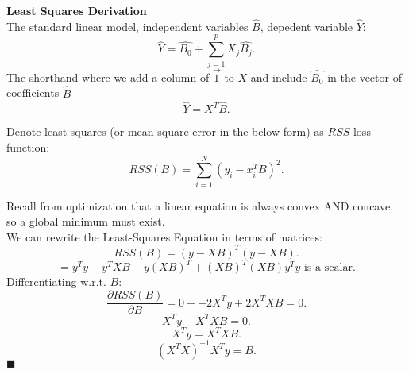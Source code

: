 \documentclass[a4paper]{article}
\begin{document}
\textbf{Least Squares Derivation}\\
The standard linear model, independent variables $\hat{B}$, depedent variable $\hat{Y}$:
\[
  \hat{Y} = \hat{B_0} + \sum_{j=1}^p X_j \hat{B_j}
.\] 
The shorthand where we add a column of $\vec{1}$ to $X$ and include $\hat{B_0}$ in the vector of coefficients
$\hat{B}$ 
\[
\hat{Y} = X^T \hat{B}
.\] 

Denote least-squares (or mean square error in the below form) as $RSS$ loss function:
\[
  RSS(B) = \sum_{i=1}^N (y_i - x_i^T B)^2
.\] 

Recall from optimization that a linear equation is always convex AND concave, so a global minimum must exist. \\
We can rewrite the Least-Squares Equation in terms of matrices:
\[
RSS(B) = (y - XB)^T (y - XB)
.\] 
\[
  = y^Ty - y^T XB - y (XB)^T + (XB)^T (XB) \text{$y^Ty$ is a scalar}
.\] 
Differentiating w.r.t. $B$:
\[
 \frac{\partial RSS(B)}{\partial B} = 0 + -2X^Ty + 2X^T X B = 0
.\]
\[
X^Ty - X^T X B = 0
.\] 
\[
X^Ty = X^TX B
.\] 
\[
  (X^T X)^{-1} X^T y = B
.\] 
$\blacksquare$   
\end{document}
